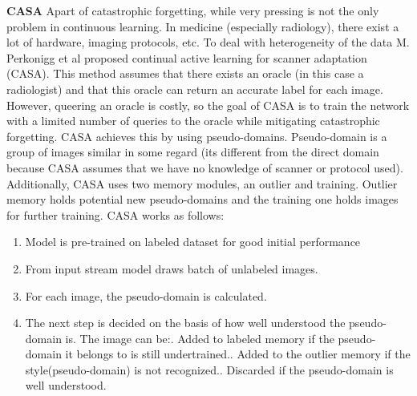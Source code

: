 \documentclass{IEEEcsmag}
\begin{document}
    \textbf{CASA} Apart of catastrophic forgetting, while very pressing is not the only problem in continuous learning.
    In medicine (especially radiology), there exist a lot of hardware, imaging protocols, etc.
    To deal with heterogeneity of the data M. Perkonigg et al\cite{cite-10} proposed  continual active learning for scanner adaptation (CASA).
    This method assumes that there exists an oracle (in this case a radiologist) and that this oracle can return an accurate label for each image.
    However, queering an oracle is costly, so the goal of CASA is to train the network with a limited number of queries to the oracle while mitigating catastrophic forgetting.
    CASA achieves this by using pseudo-domains.
    Pseudo-domain is a group of images similar in some regard (its different from the direct domain because CASA assumes that we have no knowledge of scanner or protocol used).
    Additionally, CASA uses two memory modules, an outlier and training. 
    Outlier memory holds potential new pseudo-domains and the training one holds images for further training.
    CASA works as follows:
    \begin{enumerate}
        \item Model is pre-trained on labeled dataset for good initial performance
        \item From input stream model draws batch of unlabeled images.
        \item For each image, the pseudo-domain is calculated.
        \item The next step is decided on the basis of how well understood the pseudo-domain is. The image can be:. Added to labeled memory if the pseudo-domain it belongs to is still undertrained.. Added to the outlier memory if the style(pseudo-domain) is not recognized.. Discarded if the pseudo-domain is well understood.
    \end{enumerate}
        
\end{document}
